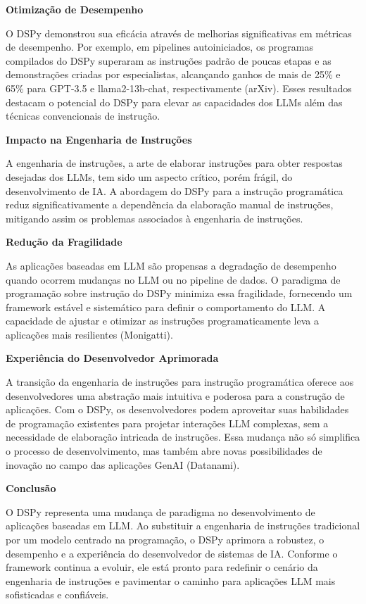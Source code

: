 \documentclass[tcc,capa]{texufpel}
\begin{document}
\textbf{Otimização de Desempenho}

O DSPy demonstrou sua eficácia através de melhorias significativas em métricas de desempenho. Por exemplo, em pipelines autoiniciados, os programas compilados do DSPy superaram as instruções padrão de poucas etapas e as demonstrações criadas por especialistas, alcançando ganhos de mais de 25\% e 65\% para GPT-3.5 e llama2-13b-chat, respectivamente (arXiv). Esses resultados destacam o potencial do DSPy para elevar as capacidades dos LLMs além das técnicas convencionais de instrução.

\textbf{Impacto na Engenharia de Instruções}

A engenharia de instruções, a arte de elaborar instruções para obter respostas desejadas dos LLMs, tem sido um aspecto crítico, porém frágil, do desenvolvimento de IA. A abordagem do DSPy para a instrução programática reduz significativamente a dependência da elaboração manual de instruções, mitigando assim os problemas associados à engenharia de instruções.

\textbf{Redução da Fragilidade}

As aplicações baseadas em LLM são propensas a degradação de desempenho quando ocorrem mudanças no LLM ou no pipeline de dados. O paradigma de programação sobre instrução do DSPy minimiza essa fragilidade, fornecendo um framework estável e sistemático para definir o comportamento do LLM. A capacidade de ajustar e otimizar as instruções programaticamente leva a aplicações mais resilientes (Monigatti).

\textbf{Experiência do Desenvolvedor Aprimorada}

A transição da engenharia de instruções para instrução programática oferece aos desenvolvedores uma abstração mais intuitiva e poderosa para a construção de aplicações. Com o DSPy, os desenvolvedores podem aproveitar suas habilidades de programação existentes para projetar interações LLM complexas, sem a necessidade de elaboração intricada de instruções. Essa mudança não só simplifica o processo de desenvolvimento, mas também abre novas possibilidades de inovação no campo das aplicações GenAI (Datanami).

\textbf{Conclusão}

O DSPy representa uma mudança de paradigma no desenvolvimento de aplicações baseadas em LLM. Ao substituir a engenharia de instruções tradicional por um modelo centrado na programação, o DSPy aprimora a robustez, o desempenho e a experiência do desenvolvedor de sistemas de IA. Conforme o framework continua a evoluir, ele está pronto para redefinir o cenário da engenharia de instruções e pavimentar o caminho para aplicações LLM mais sofisticadas e confiáveis.
\end{document}
